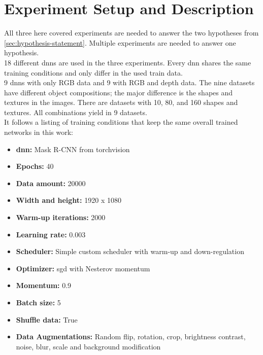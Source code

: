 \chapter{Experiment Setup and Description}
\label{chap:kapitel4}

	All three here covered experiments are needed to answer the two hypotheses from \ref{sec:hypothesis-statement}. Multiple experiments are needed to answer one hypothesis.\\
	18 different \acl{dnn}s are used in the three experiments. Every \ac{dnn} shares the same training conditions and only differ in the used train data.\\
	9 \ac{dnn}s with only RGB data and 9 with RGB and depth data. The nine datasets have different object compositions; the major difference is the shapes and textures in the images. There are datasets with 10, 80, and 160 shapes and textures. All combinations yield in 9 datasets.\\
	It follows a listing of training conditions that keep the same overall trained networks in this work:
	\begin{itemize}
		\item \textbf{\ac{dnn}:} Mask R-CNN from torchvision
		\item \textbf{Epochs:} 40
		\item \textbf{Data amount:} 20000
		\item \textbf{Width and height:} 1920 x 1080
		\item \textbf{Warm-up iterations:} 2000
		\item \textbf{Learning rate:} 0.003
		\item \textbf{Scheduler:} Simple custom scheduler with warm-up and down-regulation
		\item \textbf{Optimizer:} \acl{sgd} with Nesterov momentum \cite{Botev2016}
		\item \textbf{Momentum:} 0.9
		\item \textbf{Batch size:} 5
		\item \textbf{Shuffle data:} True
		\item \textbf{Data Augmentations:} Random flip, rotation, crop, brightness contrast, noise, blur, scale and background modification
	\end{itemize}
	
